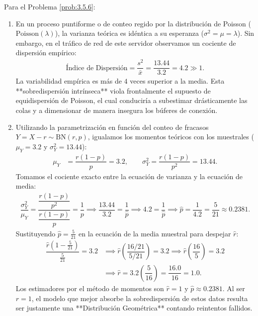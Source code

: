 \begin{solucion}
	\label{sol:3.5.6}
	Para el Problema \ref{prob:3.5.6}:
	\begin{enumerate}
		\item En un proceso puntiforme o de conteo regido por la distribución de Poisson ($\text{Poisson}(\lambda)$), la varianza teórica es idéntica a su esperanza ($\sigma^2 = \mu = \lambda$). Sin embargo, en el tráfico de red de este servidor observamos un cociente de dispersión empírico:
		\begin{align*}
			\text{Índice de Dispersión} = \dfrac{s^2}{\bar{x}} = \dfrac{13.44}{3.2} = 4.2 \gg 1.
		\end{align*}
		La variabilidad empírica es más de $4$ veces superior a la media. Esta **sobredispersión intrínseca** viola frontalmente el supuesto de equidispersión de Poisson, el cual conduciría a subestimar drásticamente las colas y a dimensionar de manera insegura los búferes de conexión.
		\item Utilizando la parametrización en función del conteo de fracasos $Y = X - r \sim \text{BN}(r, p)$, igualamos los momentos teóricos con los muestrales ($\mu_Y = 3.2$ y $\sigma_Y^2 = 13.44$):
		\begin{align*}
			\mu_Y &= \dfrac{r(1-p)}{p} = 3.2, \qquad \sigma_Y^2 = \dfrac{r(1-p)}{p^2} = 13.44.
		\end{align*}
		Tomamos el cociente exacto entre la ecuación de varianza y la ecuación de media:
		\begin{align*}
			\dfrac{\sigma_Y^2}{\mu_Y} = \dfrac{\dfrac{r(1-p)}{p^2}}{\dfrac{r(1-p)}{p}} = \dfrac{1}{p} \implies \dfrac{13.44}{3.2} = \dfrac{1}{\hat{p}} \implies 4.2 = \dfrac{1}{\hat{p}} \implies \hat{p} = \dfrac{1}{4.2} = \dfrac{5}{21} \approx 0.2381.
		\end{align*}
		Sustituyendo $\hat{p} = \frac{5}{21}$ en la ecuación de la media muestral para despejar $\hat{r}$:
		\begin{align*}
			\dfrac{\hat{r}\left(1 - \frac{5}{21}\right)}{\frac{5}{21}} = 3.2 &\implies \hat{r}\left(\dfrac{16/21}{5/21}\right) = 3.2 \implies \hat{r}\left(\dfrac{16}{5}\right) = 3.2 \\
			&\implies \hat{r} = 3.2 \left(\dfrac{5}{16}\right) = \dfrac{16.0}{16} = 1.0.
		\end{align*}
		Los estimadores por el método de momentos son $\hat{r} = 1$ y $\hat{p} \approx 0.2381$. Al ser $r=1$, el modelo que mejor absorbe la sobredispersión de estos datos resulta ser justamente una **Distribución Geométrica** contando reintentos fallidos.
	\end{enumerate}
\end{solucion}

